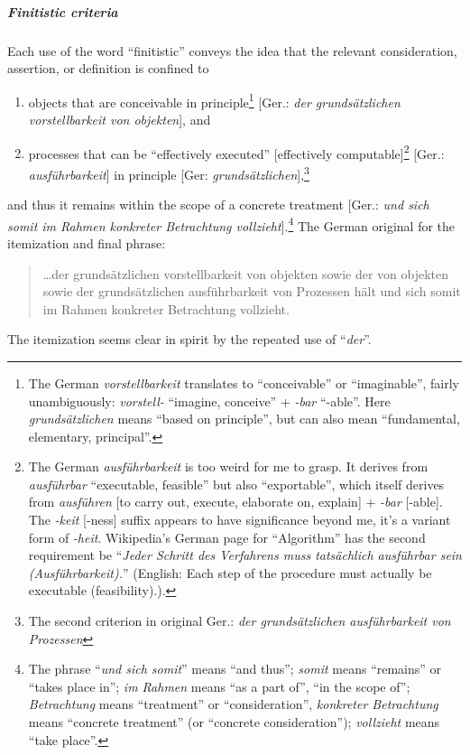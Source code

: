 \subparagraph{Finitistic criteria}
Each use of the word ``finitistic'' conveys the idea that the relevant
consideration, assertion, or definition is confined to
\begin{enumerate}
\item objects that are conceivable in principle\footnote{The German
\textit{vorstellbarkeit} translates to ``conceivable'' or
``imaginable'', fairly unambiguously: \textit{vorstell-} ``imagine,
conceive'' + \textit{-bar} ``-able''. Here
\textit{grunds\"{a}tzlichen} means ``based on principle'', but can
also mean ``fundamental, elementary, principal''.}
  [Ger.: \textit{der grunds\"{a}tzlichen vorstellbarkeit von objekten\/}], and
\item processes that can be ``effectively executed'' [effectively computable]\footnote{The
German \textit{ausf\"{u}hrbarkeit} is too weird for me to grasp. It
derives from \textit{ausf\"{u}hrbar} ``executable, feasible'' but also
``exportable'', which itself derives from \textit{ausf\"{u}hren} [to
  carry out, execute, elaborate on, explain] + \textit{-bar}
[-able]. The \textit{-keit} [-ness] suffix appears to have
significance beyond me, it's a variant form of
\textit{-heit}. Wikipedia's German page for ``Algorithm'' has the
second requirement be ``\textit{Jeder Schritt des Verfahrens muss
  tats\"{a}chlich ausf\"{u}hrbar sein (Ausf\"{u}hrbarkeit).\/}''
(English: Each step of the procedure must actually be executable (feasibility).).} [Ger.: \textit{ausf\"{u}hrbarkeit}] in principle [Ger: \textit{grunds\"{a}tzlichen}],\footnote{The second criterion in original Ger.: \textit{der grunds\"{a}tzlichen ausf\"{u}hrbarkeit von Prozessen}}
\end{enumerate}
and thus it remains within the scope of a concrete treatment [Ger.:
  \textit{und sich somit im Rahmen konkreter Betrachtung
    vollzieht\/}].\footnote{The phrase ``\textit{und sich somit\/}''
means ``and thus''; \textit{somit\/} means ``remains'' or ``takes
place in''; \textit{im Rahmen} means ``as a part of'', ``in the scope of''; \textit{Betrachtung\/} means
``treatment'' or ``consideration'', \textit{konkreter Betrachtung\/}
means ``concrete treatment'' (or ``concrete consideration''); \textit{vollzieht\/} means ``take place''.}
The
German original for the itemization and final phrase:
\begin{quote}
\dots der grunds\"{a}tzlichen vorstellbarkeit von objekten sowie der von objekten sowie der grunds\"{a}tzlichen ausf\"{u}hrbarkeit von Prozessen h\"{a}lt und sich somit im Rahmen konkreter Betrachtung vollzieht.
\end{quote}
The itemization seems clear in spirit by the repeated use of
``\textit{der\/}''.

